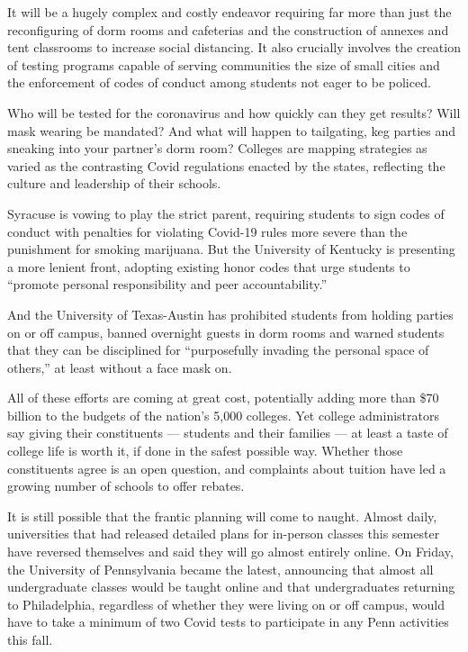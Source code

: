It will be a hugely complex and costly endeavor requiring far more than
just the reconfiguring of dorm rooms and cafeterias and the construction
of annexes and tent classrooms to increase social distancing. It also
crucially involves the creation of testing programs capable of serving
communities the size of small cities and the enforcement of codes of
conduct among students not eager to be policed.

Who will be tested for the coronavirus and how quickly can they get
results? Will mask wearing be mandated? And what will happen to
tailgating, keg parties and sneaking into your partner's dorm room?
Colleges are mapping strategies as varied as the contrasting Covid
regulations enacted by the states, reflecting the culture and leadership
of their schools.

Syracuse is vowing to play the strict parent, requiring students to sign
codes of conduct with penalties for violating Covid-19 rules more severe
than the punishment for smoking marijuana. But the University of
Kentucky is presenting a more lenient front, adopting existing honor
codes that urge students to ``promote personal responsibility and peer
accountability.''

And the University of Texas-Austin has prohibited students from holding
parties on or off campus, banned overnight guests in dorm rooms and
warned students that they can be disciplined for ``purposefully invading
the personal space of others,'' at least without a face mask on.

All of these efforts are coming at great cost, potentially adding more
than \$70 billion to the budgets of the nation's 5,000 colleges. Yet
college administrators say giving their constituents --- students and
their families --- at least a taste of college life is worth it, if done
in the safest possible way. Whether those constituents agree is an open
question, and complaints about tuition have led a growing number of
schools to offer rebates.

It is still possible that the frantic planning will come to naught.
Almost daily, universities that had released detailed plans for
in-person classes this semester have reversed themselves and said they
will go almost entirely online. On Friday, the University of
Pennsylvania became the latest, announcing that almost all undergraduate
classes would be taught online and that undergraduates returning to
Philadelphia, regardless of whether they were living on or off campus,
would have to take a minimum of two Covid tests to participate in any
Penn activities this fall.

